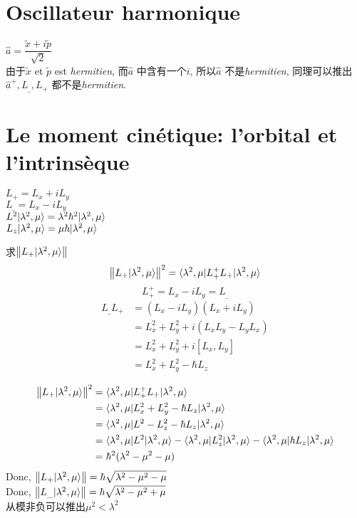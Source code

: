 \section{Oscillateur harmonique}
$\hat{a} = \dfrac{\tilde{x} + i\tilde{p}}{\sqrt{2}}$\\
由于$\tilde{x}$ et $\tilde{p}$ est \textit{hermitien}, 而$\hat{a}$ 中含有一个$i$, 所以$\hat{a}$ 不是\textit{hermitien}, 
同理可以推出$\hat{a}^+, L_{\_}, L_+$ 都不是\textit{hermitien}.

\section{Le moment cin\'etique: l'orbital et l'intrins\`eque}
\noindent
$L_+ = L_x + i L_y$\\
$L_{\_} = L_x - i L_y$\\
$L^2|\lambda^2,\mu\rangle = \lambda^2 \hbar^2 |\lambda^2,\mu\rangle$\\
$L_z|\lambda^2,\mu\rangle = \mu \hbar |\lambda^2,\mu\rangle$

求$\left\Vert L_+|\lambda^2, \mu\rangle\right\Vert$
$$
\left\Vert L_+ |\lambda^2,\mu\rangle\right\Vert^2 = \langle\lambda^2,\mu|L_+^+ L_+|\lambda^2,\mu\rangle
$$
$$
L_+^+ = L_x - i L_y = L_{\_}
$$
\begin{equation}
\begin{aligned}
L_{\_} L_+
& = (L_x - i L_y)(L_x + i L_y)\\
& = L_x^2 + L_y^2 + i(L_x L_y - L_y L_x)\\
& = L_x^2 + L_y^2 + i[L_x, L_y]\\
& = L_x^2 + L_y^2 - \hbar L_z
\end{aligned}
\end{equation}

\begin{equation}
\begin{aligned}
\left\Vert L_+ |\lambda^2,\mu\rangle\right\Vert^2
& = \langle\lambda^2,\mu|L_+^+ L_+|\lambda^2,\mu\rangle\\
& = \langle\lambda^2,\mu|L_x^2 + L_y^2 - \hbar L_z|\lambda^2,\mu\rangle\\
& = \langle\lambda^2,\mu|L^2 - L_z^2 - \hbar L_z|\lambda^2,\mu\rangle\\
& = \langle\lambda^2,\mu|L^2|\lambda^2,\mu\rangle
- \langle\lambda^2,\mu|L_z^2|\lambda^2,\mu\rangle
- \langle\lambda^2,\mu|\hbar L_z|\lambda^2,\mu\rangle\\
& = \hbar^2(\lambda^2 - \mu^2 - \mu)
\end{aligned}
\end{equation}
Donc, $\left\Vert L_+ |\lambda^2,\mu\rangle\right\Vert = \hbar \sqrt{\lambda^2 - \mu^2 - \mu}$\\
Donc, $\left\Vert L_{\_} |\lambda^2,\mu\rangle\right\Vert = \hbar \sqrt{\lambda^2 - \mu^2 + \mu}$\\
从模非负可以推出$\mu^2 < \lambda^2$

